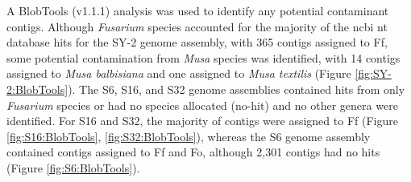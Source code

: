 A BlobTools (v1.1.1) analysis was used to identify any potential contaminant contigs. Although \textit{Fusarium} species accounted for the majority of the \ac{ncbi} nt database hits for the SY-2 genome assembly, with 365 contigs assigned to \ac{Ff}, some potential contamination from \textit{Musa} species was identified, with 14 contigs assigned to \textit{Musa balbisiana} and one assigned to \textit{Musa textilis} (Figure \ref{fig:SY-2:BlobTools}). The S6, S16, and S32 genome assemblies contained hits from only \textit{Fusarium} species or had no species allocated (no-hit) and no other genera were identified. For S16 and S32, the majority of contigs were assigned to \ac{Ff} (Figure \ref{fig:S16:BlobTools}, \ref{fig:S32:BlobTools}), whereas the  S6 genome assembly contained contigs assigned to \ac{Ff} and \ac{Fo}, although 2,301 contigs had no hits (Figure \ref{fig:S6:BlobTools}).  

